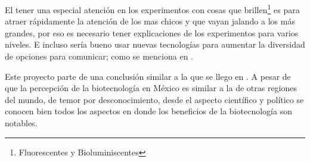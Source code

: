 \documentclass[12pt]{article}
\begin{document}
	\par El tener una especial atención en los experimentos con cosas que brillen\footnote{Fluorescentes y Bioluminiscentes} es para atraer rápidamente la atención de los mas chicos y que vayan jalando a los más grandes, por eso es necesario tener explicaciones de los experimentos para varios niveles. E incluso sería bueno usar nuevas tecnologías para aumentar la diversidad de opciones para comunicar; como se menciona en \cite{vr}.
	\par Este proyecto parte de una conclusión similar a la que se llego en \cite{biot mexico}. A pesar de que la percepción de la biotecnología en México es similar a la de otras regiones del mundo, de temor por desconocimiento, desde el aspecto científico y político se conocen bien todos los aspectos en donde los beneficios de la biotecnología son notables.
\end{document}
